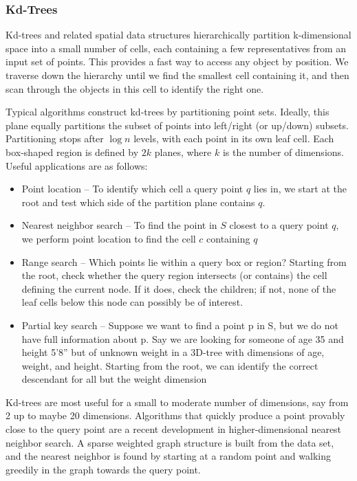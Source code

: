 \documentclass{article}
\begin{document}
\subsubsection{Kd-Trees}
    Kd-trees and related spatial data structures hierarchically partition k-dimensional space into a small number of cells, each containing a few representatives from an input set of points. This provides a fast way to access any object by position. We traverse down the hierarchy until we find the smallest cell containing it, and then scan through the objects in this cell to identify the right one.
    
    Typical algorithms construct kd-trees by partitioning point sets. Ideally, this plane equally partitions the subset of points into left/right (or up/down) subsets. Partitioning stops after $\log n$ levels, with each point in its own leaf cell. Each box-shaped region is defined by $2k$ planes, where $k$ is the number of dimensions. Useful applications are as follows:
    
    \begin{itemize}
        \item Point location – To identify which cell a query point $q$ lies in, we start at the root and test which side of the partition plane contains $q$. 
        
        \item Nearest neighbor search – To find the point in $S$ closest to a query point $q$, we perform point location to find the cell $c$ containing $q$
        
        \item Range search – Which points lie within a query box or region? Starting from the root, check whether the query region intersects (or contains) the cell defining the current node. If it does, check the children; if not, none of the leaf cells below this node can possibly be of interest.
        
        \item Partial key search – Suppose we want to find a point p in S, but we do not have full information about p. Say we are looking for someone of age 35 and height 5’8” but of unknown weight in a 3D-tree with dimensions of age, weight, and height. Starting from the root, we can identify the correct descendant for all but the weight dimension
    \end{itemize}
    
    Kd-trees are most useful for a small to moderate number of dimensions, say from 2 up to maybe 20 dimensions. Algorithms that quickly produce a point provably close to the query point are a recent development in higher-dimensional nearest neighbor search. A sparse weighted graph structure is built from the data set, and the nearest neighbor is found by starting at a random point and walking greedily in the graph towards the query point.
\end{document}
